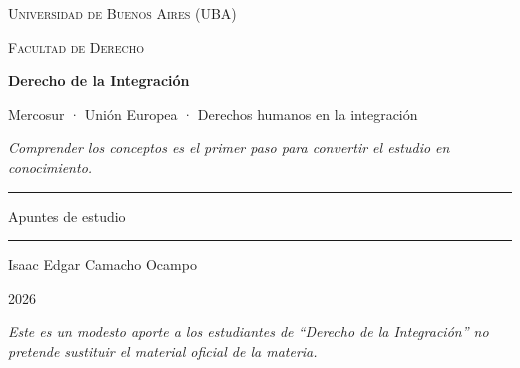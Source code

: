 \documentclass[12pt,oneside]{book}
\newcommand{\universidad}{Universidad de Buenos Aires (UBA)}
\newcommand{\facultad}{Facultad de Derecho}
\newcommand{\materia}{Derecho de la Integración}
\newcommand{\subtitulo}{Mercosur · Unión Europea · Derechos humanos en la integración}
\newcommand{\autor}{Isaac Edgar Camacho Ocampo}
\newcommand{\anio}{2026}
\begin{document}
\begin{titlepage}

\thispagestyle{empty}

\begin{center}

\vspace*{1cm}

{\large \textsc{\universidad}}

\vspace{0.2cm}

{\large \textsc{\facultad}}

\vspace{3cm}

{\Huge \textbf{\materia}}

\vspace{1cm}

{\LARGE \subtitulo}

\vspace{0.8cm}

\textit{Comprender los conceptos es el primer paso para convertir el estudio en conocimiento.}

\vspace{1.2cm}

\rule{0.70\textwidth}{0.5pt}

\vspace{0.5cm}

{\large Apuntes de estudio}

\vspace{0.5cm}

\rule{0.70\textwidth}{0.5pt}

\vfill

{\large \autor}

\vspace{0.3cm}

{\large \anio}

\end{center}

\vfill

\begin{flushleft}
\textit{Este es un modesto aporte a los estudiantes de ``Derecho de la Integración'' no pretende sustituir el material oficial de la materia.}
\end{flushleft}

\end{titlepage}

\tableofcontents
\end{document}
